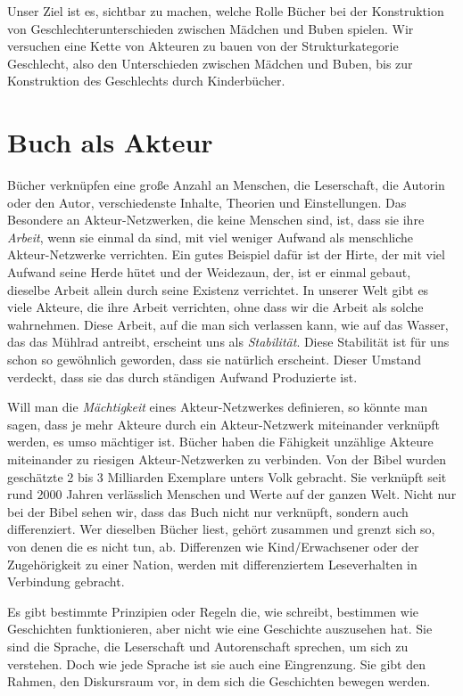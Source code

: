 Unser Ziel ist es, sichtbar zu machen, welche Rolle Bücher bei der Konstruktion von Geschlechterunterschieden zwischen Mädchen und Buben spielen. Wir versuchen eine Kette von Akteuren zu bauen von der Strukturkategorie Geschlecht, also den Unterschieden zwischen Mädchen und Buben, bis zur Konstruktion des Geschlechts durch Kinderbücher. 



\section{Buch als Akteur}

Bücher verknüpfen eine große Anzahl an Menschen, die Leserschaft, die Autorin oder den Autor, verschiedenste Inhalte, Theorien und Einstellungen.
Das Besondere an Akteur-Netzwerken, die keine Menschen sind, ist, dass sie ihre \emph{Arbeit}, wenn sie einmal da sind, mit viel weniger Aufwand als menschliche Akteur-Netzwerke verrichten.
Ein gutes Beispiel dafür ist der Hirte, der mit viel Aufwand seine Herde hütet und der Weidezaun, der, ist er einmal gebaut, dieselbe Arbeit allein durch seine Existenz verrichtet.
In unserer Welt gibt es viele Akteure, die ihre Arbeit verrichten, ohne dass wir die Arbeit als solche wahrnehmen.
Diese Arbeit, auf die man sich verlassen kann, wie auf das Wasser, das das Mühlrad antreibt, erscheint uns als \emph{Stabilität}.
Diese Stabilität ist für uns schon so gewöhnlich geworden, dass sie natürlich erscheint. Dieser Umstand verdeckt, dass sie das durch ständigen Aufwand Produzierte ist.

Will man die \emph{Mächtigkeit} eines Akteur-Netzwerkes definieren, so könnte man sagen, dass je mehr Akteure durch ein Akteur-Netzwerk miteinander verknüpft werden, es umso mächtiger ist.
Bücher haben die Fähigkeit unzählige Akteure miteinander zu riesigen Akteur-Netzwerken zu verbinden.
Von der Bibel wurden \zB geschätzte 2 bis 3 Milliarden Exemplare unters Volk gebracht. Sie verknüpft seit rund 2000 Jahren verlässlich Menschen und Werte auf der ganzen Welt.
Nicht nur bei der Bibel sehen wir, dass das Buch nicht nur verknüpft, sondern auch differenziert. Wer dieselben Bücher liest, gehört zusammen und grenzt sich so, von denen die es nicht tun, ab. Differenzen wie Kind/Erwachsener oder der Zugehörigkeit zu einer Nation, werden mit differenziertem Leseverhalten in Verbindung gebracht.
\parencites[Kap.\,3 in][]{Postman2011}[50]{McLuhan2012}

Es gibt bestimmte Prinzipien oder  Regeln die, wie  schreibt, bestimmen wie Geschichten funktionieren, aber nicht wie eine Geschichte auszusehen hat.  Sie sind die Sprache, die Leserschaft und Autorenschaft sprechen, um sich zu verstehen. \parencite[30]{Daehnke2003} Doch wie jede Sprache ist sie auch eine Eingrenzung. Sie gibt den Rahmen, den Diskursraum vor, in dem sich die Geschichten bewegen werden.

